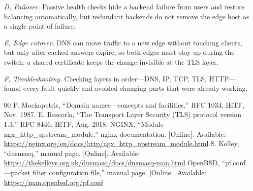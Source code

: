 \documentclass[conference]{IEEEtran}
\begin{document}
\textit{D, Failover.} Passive health checks hide a backend failure from users and restore balancing automatically, but redundant backends do not remove the edge host as a single point of failure.

\textit{E, Edge cutover.} DNS can move traffic to a new edge without touching clients, but only after cached answers expire, so both edges must stay up during the switch; a shared certificate keeps the change invisible at the TLS layer.

\textit{F, Troubleshooting.} Checking layers in order---DNS, IP, TCP, TLS, HTTP---found every fault quickly and avoided changing parts that were already working.

\begin{thebibliography}{00}
 P. Mockapetris, ``Domain names---concepts and facilities,'' RFC 1034, IETF, Nov. 1987.
 E. Rescorla, ``The Transport Layer Security (TLS) protocol version 1.3,'' RFC 8446, IETF, Aug. 2018.
 NGINX, ``Module ngx\_http\_upstream\_module,'' nginx documentation. [Online]. Available: \url{https://nginx.org/en/docs/http/ngx_http_upstream_module.html}
 S. Kelley, ``dnsmasq,'' manual page. [Online]. Available: \url{https://thekelleys.org.uk/dnsmasq/docs/dnsmasq-man.html}
 OpenBSD, ``pf.conf---packet filter configuration file,'' manual page. [Online]. Available: \url{https://man.openbsd.org/pf.conf}
\end{thebibliography}
\end{document}
